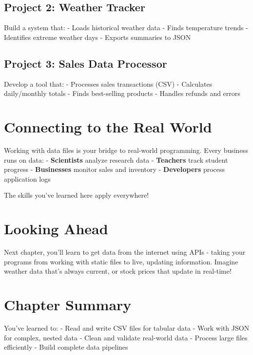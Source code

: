 \documentclass[
  letterpaper,
  DIV=11,
  numbers=noendperiod,
  oneside]{scrreprt}
\begin{document}
\subsection{Project 2: Weather Tracker}\label{project-2-weather-tracker}

Build a system that: - Loads historical weather data - Finds temperature
trends - Identifies extreme weather days - Exports summaries to JSON

\subsection{Project 3: Sales Data
Processor}\label{project-3-sales-data-processor}

Develop a tool that: - Processes sales transactions (CSV) - Calculates
daily/monthly totals - Finds best-selling products - Handles refunds and
errors

\section{Connecting to the Real
World}\label{connecting-to-the-real-world}

Working with data files is your bridge to real-world programming. Every
business runs on data: - \textbf{Scientists} analyze research data -
\textbf{Teachers} track student progress - \textbf{Businesses} monitor
sales and inventory - \textbf{Developers} process application logs

The skills you've learned here apply everywhere!

\section{Looking Ahead}\label{looking-ahead}

Next chapter, you'll learn to get data from the internet using APIs -
taking your programs from working with static files to live, updating
information. Imagine weather data that's always current, or stock prices
that update in real-time!

\section{Chapter Summary}\label{chapter-summary-11}

You've learned to: - Read and write CSV files for tabular data - Work
with JSON for complex, nested data - Clean and validate real-world data
- Process large files efficiently - Build complete data pipelines
\end{document}
